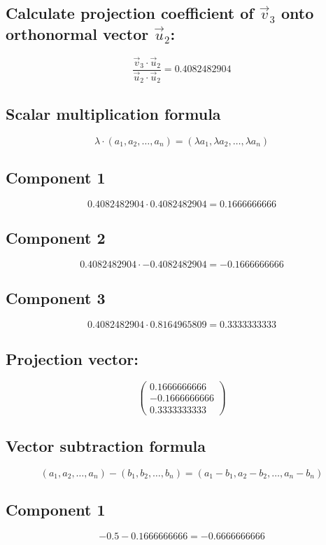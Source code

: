\documentclass{article}
\begin{document}
\subsection*{ \vspace{1em} Calculate projection coefficient of \(\vec{v}_{3}\) onto orthonormal vector \(\vec{u}_{2}\):}
\[
\frac{\vec{v}_{3} \cdot \vec{u}_{2}}{\vec{u}_{2} \cdot \vec{u}_{2}} = 0.4082482904
\]
\subsection*{ \vspace{1em} Scalar multiplication formula}
\[
\lambda \cdot (a_1, a_2, \dots, a_n) = (\lambda a_1, \lambda a_2, \dots, \lambda a_n)
\]
\subsection*{ \vspace{1em} Component 1}
\[
0.4082482904 \cdot 0.4082482904 = 0.1666666666
\]
\subsection*{ \vspace{1em} Component 2}
\[
0.4082482904 \cdot -0.4082482904 = -0.1666666666
\]
\subsection*{ \vspace{1em} Component 3}
\[
0.4082482904 \cdot 0.8164965809 = 0.3333333333
\]
\subsection*{ \vspace{1em} Projection vector:}
\[
\begin{pmatrix}0.1666666666 \\ -0.1666666666 \\ 0.3333333333\end{pmatrix}
\]
\subsection*{ \vspace{1em} Vector subtraction formula}
\[
(a_1, a_2, \dots, a_n) - (b_1, b_2, \dots, b_n) = (a_1 - b_1, a_2 - b_2, \dots, a_n - b_n)
\]
\subsection*{ \vspace{1em} Component 1}
\[
-0.5 - 0.1666666666 = -0.6666666666
\]
\end{document}
